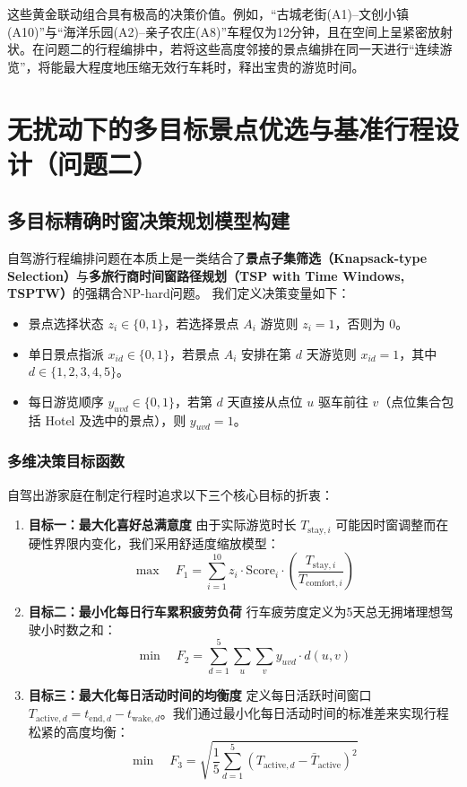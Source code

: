 \documentclass{cumcmthesis}
\begin{document}
这些黄金联动组合具有极高的决策价值。例如，“古城老街(A1)--文创小镇(A10)”与“海洋乐园(A2)--亲子农庄(A8)”车程仅为12分钟，且在空间上呈紧密放射状。在问题二的行程编排中，若将这些高度邻接的景点编排在同一天进行“连续游览”，将能最大程度地压缩无效行车耗时，释出宝贵的游览时间。
\section{无扰动下的多目标景点优选与基准行程设计（问题二）}
\subsection{多目标精确时窗决策规划模型构建}
自驾游行程编排问题在本质上是一类结合了\textbf{景点子集筛选（Knapsack-type Selection）}与\textbf{多旅行商时间窗路径规划（TSP with Time Windows, TSPTW）}的强耦合NP-hard问题\cite{ref3, ref4, ref11, ref12, ref13}。
我们定义决策变量如下：
\begin{itemize}
\item 景点选择状态 $z_i \in \{0, 1\}$，若选择景点 $A_i$ 游览则 $z_i = 1$，否则为 $0$。
\item 单日景点指派 $x_{id} \in \{0, 1\}$，若景点 $A_i$ 安排在第 $d$ 天游览则 $x_{id} = 1$，其中 $d \in \{1, 2, 3, 4, 5\}$。
\item 每日游览顺序 $y_{uvd} \in \{0, 1\}$，若第 $d$ 天直接从点位 $u$ 驱车前往 $v$（点位集合包括 Hotel 及选中的景点），则 $y_{uvd} = 1$。
\end{itemize}
\subsubsection{多维决策目标函数}
自驾出游家庭在制定行程时追求以下三个核心目标的折衷\cite{ref2, ref14, ref18, ref23}：
\begin{enumerate}
\item \textbf{目标一：最大化喜好总满意度}
由于实际游览时长 $T_{\text{stay}, i}$ 可能因时窗调整而在硬性界限内变化，我们采用舒适度缩放模型：
\begin{equation}
\max \quad F_1 = \sum_{i=1}^{10} z_i \cdot \text{Score}_i \cdot \left( \frac{T_{\text{stay}, i}}{T_{\text{comfort}, i}} \right)
\end{equation}
\item \textbf{目标二：最小化每日行车累积疲劳负荷}
行车疲劳度定义为5天总无拥堵理想驾驶小时数之和：
\begin{equation}
\min \quad F_2 = \sum_{d=1}^{5} \sum_{u} \sum_{v} y_{uvd} \cdot d(u, v)
\end{equation}
\item \textbf{目标三：最大化每日活动时间的均衡度}
定义每日活跃时间窗口 $T_{\text{active}, d} = t_{\text{end}, d} - t_{\text{wake}, d}$。我们通过最小化每日活动时间的标准差来实现行程松紧的高度均衡：
\begin{equation}
\min \quad F_3 = \sqrt{ \frac{1}{5} \sum_{d=1}^{5} \left( T_{\text{active}, d} - \bar{T}_{\text{active}} \right)^2 }
\end{equation}
\end{enumerate}
\end{document}
